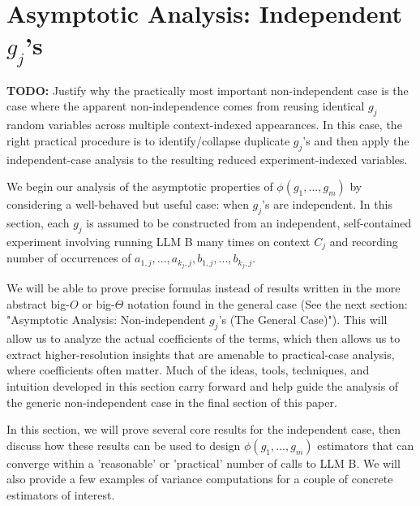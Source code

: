 \documentclass{article}
\begin{document}
\section{Asymptotic Analysis: Independent $\displaystyle g_{j}$'s}

\textbf{TODO:} Justify why the practically most important non-independent case is the case where the apparent non-independence comes from reusing identical $\displaystyle g_{j}$ random variables across multiple context-indexed appearances. In this case, the right practical procedure is to identify/collapse duplicate $\displaystyle g_{j}$'s and then apply the independent-case analysis to the resulting reduced experiment-indexed variables.

We begin our analysis of the asymptotic properties of $\displaystyle \phi \left( g_{1} ,...,g_{m}\right)$ by considering a well-behaved but useful case: when $\displaystyle g_{j}$'s are independent. In this section, each $\displaystyle g_{j}$ is assumed to be constructed from an independent, self-contained experiment involving running LLM B many times on context $\displaystyle C_{j}$ and recording number of occurrences of $\displaystyle a_{1,j} ,...,a_{k_{j} ,j} ,b_{1,j} ,...,b_{k_{j} ,j}$.



We will be able to prove precise formulas instead of results written in the more abstract big-$\displaystyle O$ or big-$\displaystyle \Theta $ notation found in the general case (See the next section: "Asymptotic Analysis: Non-independent $\displaystyle g_{j}$'s (The General Case)"). This will allow us to analyze the actual coefficients of the terms, which then allows us to extract higher-resolution insights that are amenable to practical-case analysis, where coefficients often matter. Much of the ideas, tools, techniques, and intuition developed in this section carry forward and help guide the analysis of the generic non-independent case in the final section of this paper.



In this section, we will prove several core results for the independent case, then discuss how these results can be used to design $\displaystyle \phi \left( g_{1} ,...,g_{m}\right)$ estimators that can converge within a 'reasonable' or 'practical' number of calls to LLM B. We will also provide a few examples of variance computations for a couple of concrete estimators of interest.
\end{document}
